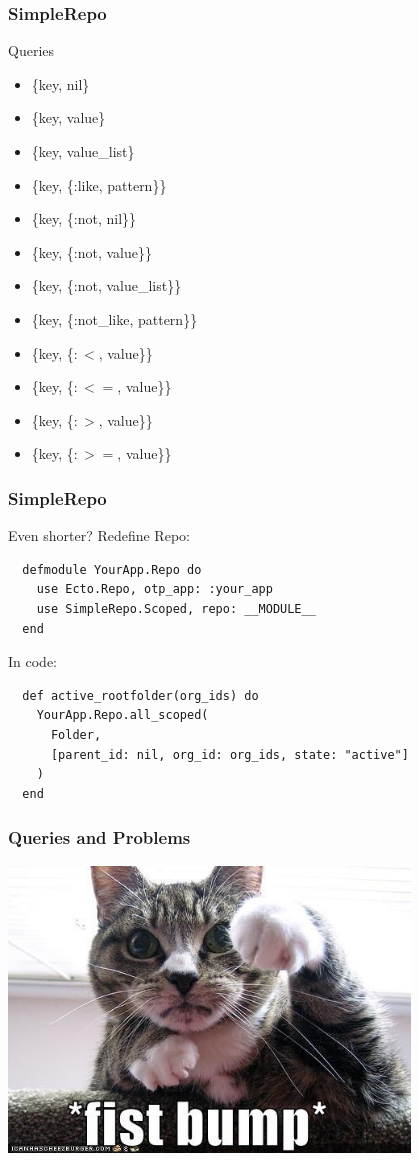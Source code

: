 \documentclass{beamer}
\begin{document}

\begin{frame}[fragile]
\frametitle{SimpleRepo}
\centerline{Queries}
\begin{itemize}
\item \{key, nil\}
\item \{key, value\}
\item \{key, value\_list\}
\item \{key, \{:like, pattern\}\}
\item \{key, \{:not, nil\}\}
\item \{key, \{:not, value\}\}
\item \{key, \{:not, value\_list\}\}
\item \{key, \{:not\_like, pattern\}\}
\item \{key, \{$:<$, value\}\}
\item \{key, \{$:<=$, value\}\}
\item \{key, \{$:>$, value\}\}
\item \{key, \{$:>=$, value\}\}
\end{itemize}
\end{frame}


\begin{frame}[fragile]
\frametitle{SimpleRepo}
\centerline{Even shorter? Redefine Repo:}
\begin{verbatim}
  defmodule YourApp.Repo do
    use Ecto.Repo, otp_app: :your_app
    use SimpleRepo.Scoped, repo: __MODULE__
  end
\end{verbatim}
\pause
\centerline{In code:}
\begin{verbatim}
  def active_rootfolder(org_ids) do
    YourApp.Repo.all_scoped(
      Folder,
      [parent_id: nil, org_id: org_ids, state: "active"]
    )
  end
\end{verbatim}
\end{frame}


\begin{frame}[fragile]
\frametitle{Queries and Problems}
\centerline{\includegraphics[width=0.8\textwidth]{fist_bump.jpg}}
\end{frame}
\end{document}
